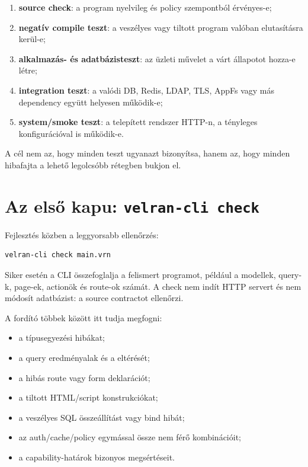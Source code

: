 \begin{enumerate}
  \item \textbf{source check}: a program nyelvileg és policy szempontból érvényes-e;
  \item \textbf{negatív compile teszt}: a veszélyes vagy tiltott program valóban elutasításra kerül-e;
  \item \textbf{alkalmazás- és adatbázisteszt}: az üzleti művelet a várt állapotot hozza-e létre;
  \item \textbf{integration teszt}: a valódi DB, Redis, LDAP, TLS, AppFs vagy más dependency együtt helyesen működik-e;
  \item \textbf{system/smoke teszt}: a telepített rendszer HTTP-n, a tényleges konfigurációval is működik-e.
\end{enumerate}

A cél nem az, hogy minden teszt ugyanazt bizonyítsa, hanem az, hogy minden hibafajta a lehető legolcsóbb rétegben bukjon el.

\section{Az első kapu: \texttt{velran-cli check}}

Fejlesztés közben a leggyorsabb ellenőrzés:

\begin{lstlisting}
velran-cli check main.vrn
\end{lstlisting}

Siker esetén a CLI összefoglalja a felismert programot, például a modellek, query-k, page-ek, actionök és route-ok számát. A check nem indít HTTP servert és nem módosít adatbázist: a source contractot ellenőrzi.

A fordító többek között itt tudja megfogni:

\begin{itemize}
  \item a típusegyezési hibákat;
  \item a query eredményalak és a  eltérését;
  \item a hibás route vagy form deklarációt;
  \item a tiltott HTML/script konstrukciókat;
  \item a veszélyes SQL összeállítást vagy bind hibát;
  \item az auth/cache/policy egymással össze nem férő kombinációit;
  \item a capability-határok bizonyos megsértéseit.
\end{itemize}

